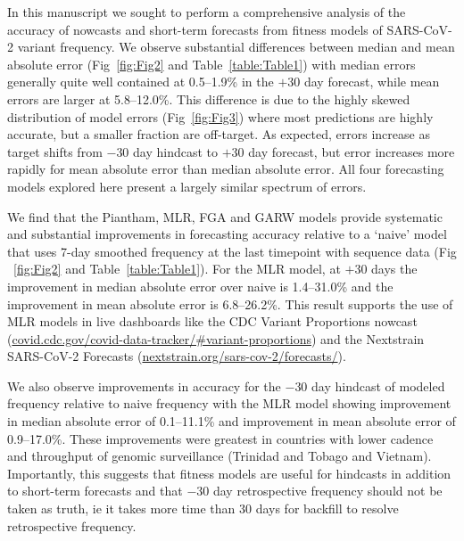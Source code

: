 \documentclass[10pt,letterpaper]{article}
\begin{document}
In this manuscript we sought to perform a comprehensive analysis of the accuracy of nowcasts and short-term forecasts from fitness models of SARS-CoV-2 variant frequency.
We observe substantial differences between median and mean absolute error (Fig~\ref{fig:Fig2} and Table~\ref{table:Table1}) with median errors generally quite well contained at 0.5--1.9\% in the $+30$ day forecast, while mean errors are larger at 5.8--12.0\%.
This difference is due to the highly skewed distribution of model errors (Fig~\ref{fig:Fig3}) where most predictions are highly accurate, but a smaller fraction are off-target.
As expected, errors increase as target shifts from $-30$ day hindcast to $+30$ day forecast, but error increases more rapidly for mean absolute error than median absolute error.
All four forecasting models explored here present a largely similar spectrum of errors.


\sloppy %
We find that the Piantham, MLR, FGA and GARW models provide systematic and substantial improvements in forecasting accuracy relative to a `naive' model that uses 7-day smoothed frequency at the last timepoint with sequence data (Fig ~\ref{fig:Fig2} and Table~\ref{table:Table1}).
For the MLR model, at $+30$ days the improvement in median absolute error over naive is 1.4--31.0\% and the improvement in mean absolute error is 6.8--26.2\%.
This result supports the use of MLR models in live dashboards like the CDC Variant Proportions nowcast (\href{https://covid.cdc.gov/covid-data-tracker/\#variant-proportions}{covid.cdc.gov/covid-data-tracker/\#variant-proportions}) and the Nextstrain SARS-CoV-2 Forecasts (\href{https://nextstrain.org/sars-cov-2/forecasts/}{nextstrain.org/sars-cov-2/forecasts/}).

We also observe improvements in accuracy for the $-30$ day hindcast of modeled frequency relative to naive frequency with the MLR model showing improvement in median absolute error of 0.1--11.1\% and improvement in mean absolute error of 0.9--17.0\%.
These improvements were greatest in countries with lower cadence and throughput of genomic surveillance (Trinidad and Tobago and Vietnam).
Importantly, this suggests that fitness models are useful for hindcasts in addition to short-term forecasts and that $-30$ day retrospective frequency should not be taken as truth, ie it takes more time than 30 days for backfill to resolve retrospective frequency.
\end{document}
